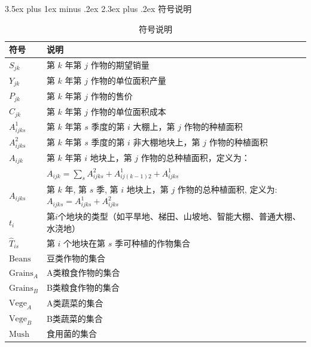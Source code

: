 \documentclass[12pt,a4paper]{nmmcm}
\makeatletter
\renewcommand\section{\@startsection{section}{1}{0pt}%
    {3.5ex plus 1ex minus .2ex}%
    {2.3ex plus .2ex}%
    {\normalfont\LARGE\bfseries}}
\makeatother
\begin{document}
\section{符号说明}
\begin{table}[htbp]
  \centering
  \caption{符号说明}
  \renewcommand{\arraystretch}{1.2}
  \setlength{\tabcolsep}{10pt}
  \begin{tabular}{p{3cm} | p{10cm}}
    \hline
    \hline
    \textbf{符号}           & \textbf{说明}                                                 \\
    \hline
    $S_{jk}$              & 第 $k$ 年第 $j$ 作物的期望销量                                        \\
    $Y_{jk}$              & 第 $k$ 年第 $j$ 作物的单位面积产量                                      \\
    $P_{jk}$              & 第 $k$ 年第 $j$ 作物的售价                                          \\
    $C_{jk}$              & 第 $k$ 年第 $j$ 作物的单位面积成本                                      \\
    $A^1_{ijks}$          & 第 $k$ 年第 $s$ 季度的第 $i$ 大棚上，第 $j$ 作物的种植面积                     \\
    $A^2_{ijks}$          & 第 $k$ 年第 $s$ 季度的第 $i$ 非大棚地块上，第 $j$ 作物的种植面积                  \\
    $A_{ijk}$             & 第 $k$ 年第 $i$ 地块上，第 $j$ 作物的总种植面积，定义为：                        \\
                          & $A_{ijk} = \sum_s A^2_{ijks} + A^1_{ij(k-1)2} + A^1_{ijks}$ \\
    $A_{ijks}$            & 第 $k$ 年, 第 $s$ 季, 第 $i$ 地块上，第 $j$ 作物的总种植面积, 定义为: $A_{ijks} = A^1_{ijks} + A^2_{ijks}$ \\
    $t_i$                 & 第$i$个地块的类型（如平旱地、梯田、山坡地、智能大棚、普通大棚、水浇地）\\
    $\hat{T}_{is}$        & 第 $i$ 个地块在第 $s$ 季可种植的作物集合 \\
    $\text{Beans}$        & 豆类作物的集合                                                     \\
    $\text{Grains}_A$     & A类粮食作物的集合                                                   \\
    $\text{Grains}_B$     & B类粮食作物的集合                                                   \\
    $\text{Vege}_A$       & A类蔬菜的集合                                                     \\
    $\text{Vege}_B$       & B类蔬菜的集合                                                     \\
    $\text{Mush}$         & 食用菌的集合                                                      \\
    \hline
    \hline
  \end{tabular}
\end{table}
\end{document}
